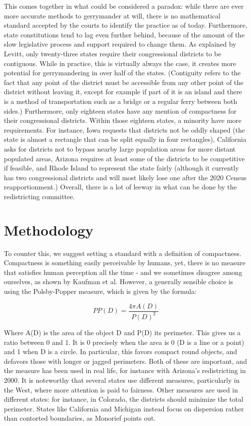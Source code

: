 \documentclass[letterpaper]{article}
\begin{document}

This comes together in what could be considered a paradox: while there are ever more accurate methods to gerrymander at will, there is no mathematical standard accepted by the courts to identify the practice as of today. Furthermore, state constitutions tend to lag even further behind, because of the amount of the slow legislative process and support required to change them. As explained by Levitt, only twenty-three states require their congressional districts to be contiguous. While in practice, this is virtually always the case, it creates more potential for gerrymandering in over half of the states. (Contiguity refers to the fact that any point of the district must be accessible from any other point of the district without leaving it, except for example if part of it is an island and there is a method of transportation such as a bridge or a regular ferry between both sides.) Furthermore, only eighteen states have any mention of compactness for their congressional districts. Within those eighteen states, a minority have more requirements. For instance, Iowa requests that districts not be oddly shaped (the state is almost a rectangle that can be split equally in four rectangles), California asks for districts not to bypass nearby large population areas for more distant populated areas, Arizona requires at least some of the districts to be competitive if feasible, and Rhode Island to represent the state fairly (although it currently has two congressional districts and will most likely lose one after the 2020 Census reapportionment.) Overall, there is a lot of leeway in what can be done by the redistricting committee. 


\section{Methodology}
To counter this, we suggest setting a standard with a definition of compactness. Compactness is something easily perceivable by humans, yet, there is no measure that satisfies human perception all the time - and we sometimes disagree among ourselves, as shown by Kaufman et al. 
However, a generally sensible choice is using the Polsby-Popper measure, which is given by the formula:

\[
	PP(D) = \frac{4\pi A(D)}{P(D)^2}
\]


Where A(D) is the area of the object D and P(D) its perimeter. This gives us a ratio between 0 and 1. It is 0 precisely when the area is 0 (D is a line or a point) and 1 when D is a circle. In particular, this favors compact round objects, and defavors those with longer or jagged perimeters. Both of these are important, and the measure has been used in real life, for instance with Arizona’s redistricting in 2000. It is noteworthy that several states use different measures, particularly in the West, where more attention is paid to fairness.
Other measures are used in different states: for instance, in Colorado, the districts should minimize the total perimeter. States like California and Michigan instead focus on dispersion rather than contorted boundaries, as Monorief points out. 
\end{document}
